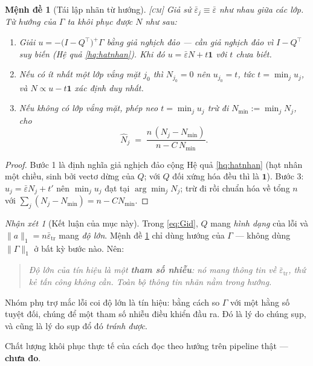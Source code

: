 \documentclass[11pt,a4paper]{article}
\newtheorem{menhde}[dinhly]{Mệnh đề}
\theoremstyle{remark}
\newtheorem{nhanxet}[dinhly]{Nhận xét}
\newcommand{\one}{\mathbf{1}}
\newcommand{\epstr}{\bar\varepsilon_{\mathrm{tr}}}
\begin{document}
\begin{menhde}[Tái lập nhãn từ hướng]
\label{md:tailap}
\textsc{[cm]}\; Giả sử $\bar\varepsilon_j\equiv\bar\varepsilon$ như nhau giữa
các lớp. Từ hướng của $\Gamma$ ta khôi phục được $N$ như sau:
\begin{enumerate}
\item Giải $u=-\bigl(I-Q^{\!\top}\bigr)^{+}\Gamma$ bằng giả nghịch đảo --- cần
  giả nghịch đảo vì $I-Q^{\!\top}$ suy biến (Hệ quả \ref{hq:hatnhan}). Khi đó
  $u=\bar\varepsilon N+t\one$ với $t$ chưa biết.
\item \emph{Nếu có ít nhất một lớp vắng mặt} $j_0$ thì $N_{j_0}=0$ nên
  $u_{j_0}=t$, tức $t=\min_j u_j$, và $N\propto u-t\one$ xác định duy nhất.
\item \emph{Nếu không có lớp vắng mặt}, phép neo $t=\min_j u_j$ trừ đi
  $N_{\min}:=\min_j N_j$, cho
  \begin{equation}
  \hat N_j \;=\; \frac{n\,(N_j-N_{\min})}{\,n-C\,N_{\min}\,}.
  \label{eq:khongvang}
  \end{equation}
\end{enumerate}
\end{menhde}

\begin{proof}
Bước 1 là định nghĩa giả nghịch đảo cộng Hệ quả \ref{hq:hatnhan} (hạt nhân
một chiều, sinh bởi vectơ dừng của $Q$; với $Q$ đối xứng hóa đều thì là
$\one$). Bước 3: $u_j=\bar\varepsilon N_j+t'$ nên $\min_j u_j$ đạt tại
$\arg\min_j N_j$; trừ đi rồi chuẩn hóa về tổng $n$ với
$\sum_j(N_j-N_{\min})=n-CN_{\min}$.
\end{proof}

\begin{nhanxet}[Kết luận của mục này]
\label{nx:nhieu}
Trong \eqref{eq:Gid}, $Q$ mang \emph{hình dạng} của lỗi và $\|a\|_1=n\epstr$
mang \emph{độ lớn}. Mệnh đề \ref{md:tailap} chỉ dùng hướng của $\Gamma$ ---
không dùng $\|\Gamma\|_1$ ở bất kỳ bước nào. Nên:

\begin{quote}
\emph{Độ lớn của tín hiệu là một \textbf{tham số nhiễu}: nó mang thông tin về
$\epstr$, thứ kẻ tấn công không cần. Toàn bộ thông tin nhãn nằm trong hướng.}
\end{quote}

Nhóm phụ trợ mắc lỗi coi độ lớn là tín hiệu: bằng cách so $\Gamma$ với một
hằng số tuyệt đối, chúng để một tham số nhiễu điều khiển đầu ra. Đó là lý do
chúng sụp, và cũng là lý do sụp đổ đó \emph{tránh được}.

Chất lượng khôi phục thực tế của cách đọc theo hướng trên pipeline thật ---
\textbf{chưa đo}.
\end{nhanxet}
\end{document}
